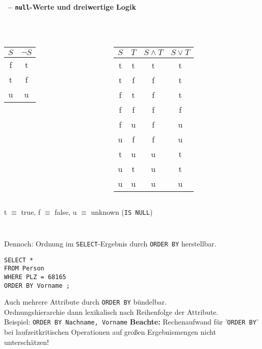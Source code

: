 \begin{frame}\frametitle{\insertsection}
\framesubtitle{\insertsubsection\ -- \texttt{null}-Werte und dreiwertige Logik}
\\[4pt]
\begin{columns}
\begin{column}{0.5 \textwidth}
\begin{center}
	\begin{tabular}{c||c}
		$S$ & $\neg S$\\\hline\hline
		f & t \\
		t & f \\\hline
		u & u \\
	\end{tabular}
\end{center}
\end{column}
\begin{column}{0.6 \textwidth}
\begin{tabular}{c|c||c|c}
	$S$ & $T$ & $S \wedge T$ & $S \vee T$\\\hline\hline
	t & t & t & t\\
	t & f & f & t\\
	f & t & f & t\\
	f & f & f & f\\\hline
	f & u & f & u\\
	u & f & f & u\\
	t & u & u & t\\
	u & t & u & t\\
	u & u & u & u\\
\end{tabular}
\end{column}	
\end{columns}
\abs
\hspace*{9em}t $\equiv$ true, f $\equiv$ false, u $\equiv$ unknown (\texttt{IS NULL})
\end{frame}

\begin{frame}[fragile]\frametitle{\insertsection}
\framesubtitle{\insertsubsection}
\onslide
{}\\[4pt]
Dennoch: Ordnung im \texttt{SELECT}-Ergebnis durch \texttt{ORDER BY} herstellbar.
\begin{lstlisting}[xleftmargin=3ex]
SELECT *
FROM Person
WHERE PLZ = 68165
ORDER BY Vorname ;
\end{lstlisting}
\pause
\abs
Auch mehrere Attribute durch \texttt{ORDER BY} b\"undelbar. 
\\
Ordnungshierarchie dann lexikalisch nach Reihenfolge der Attribute.
\\Beispiel: \texttt{ORDER BY Nachname, Vorname}
\pause
\abs
\textbf{Beachte:} Rechenaufwand f\"ur '\texttt{ORDER BY}' bei laufzeitkritischen Operationen  
auf gro\ss en Ergebnismengen nicht unterschätzen!
\end{frame}

